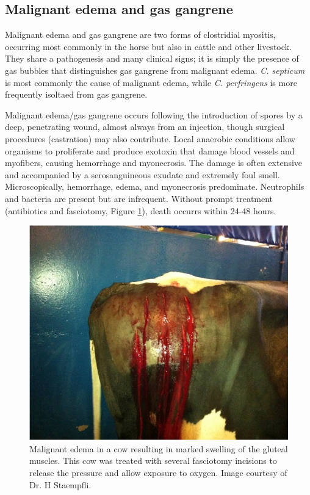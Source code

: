 \documentclass[openany]{report}
\begin{document}
\subsection{Malignant edema and gas
gangrene}\label{malignant-edema-and-gas-gangrene}

Malignant edema and gas gangrene are two forms of clostridial myositis,
occurring most commonly in the horse but also in cattle and other
livestock. They share a pathogenesis and many clinical signs; it is
simply the presence of gas bubbles that distinguishes gas gangrene from
malignant edema. \emph{C. septicum} is most commonly the cause of
malignant edema, while \emph{C. perfringens} is more frequently isoltaed
from gas gangrene.

Malignant edema/gas gangrene occurs following the introduction of spores
by a deep, penetrating wound, almost always from an injection, though
surgical procedures (castration) may also contribute. Local anaerobic
conditions allow organisms to proliferate and produce exotoxin that
damage blood vessels and myofibers, causing hemorrhage and myonecrosis.
The damage is often extensive and accompanied by a serosanguineous
exudate and extremely foul smell. Microscopically, hemorrhage, edema,
and myonecrosis predominate. Neutrophils and bacteria are present but
are infrequent. Without prompt treatment (antibiotics and fasciotomy,
Figure \ref{fig:fasciotomy}), death occurrs within 24-48 hours.

\begin{figure}

{\centering \includegraphics[width=0.6\linewidth]{images/fasciotomy} 

}

\caption{Malignant edema in a cow resulting in marked swelling of the gluteal muscles. This cow was treated with several fasciotomy incisions to release the pressure and allow exposure to oxygen. Image courtesy of Dr. H Staempfli.}\label{fig:fasciotomy}
\end{figure}
\end{document}
